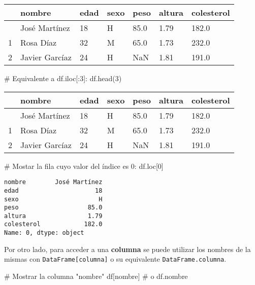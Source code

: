 \documentclass[
  letterpaper,
  DIV=11,
  numbers=noendperiod]{scrreprt}
\newenvironment{Shaded}{\begin{snugshade}}{\end{snugshade}}
\newcommand{\CommentTok}[1]{\textcolor[rgb]{0.37,0.37,0.37}{#1}}
\newcommand{\DecValTok}[1]{\textcolor[rgb]{0.68,0.00,0.00}{#1}}
\newcommand{\NormalTok}[1]{\textcolor[rgb]{0.00,0.23,0.31}{#1}}
\newcommand{\StringTok}[1]{\textcolor[rgb]{0.13,0.47,0.30}{#1}}
\begin{document}
\begin{longtable}[]{@{}lllllll@{}}
\toprule\noalign{}
& nombre & edad & sexo & peso & altura & colesterol \\
\midrule\noalign{}
\endhead
\bottomrule\noalign{}
\endlastfoot
0 & José Martínez & 18 & H & 85.0 & 1.79 & 182.0 \\
1 & Rosa Díaz & 32 & M & 65.0 & 1.73 & 232.0 \\
2 & Javier Garcíaz & 24 & H & NaN & 1.81 & 191.0 \\
\end{longtable}

\begin{Shaded}
\begin{Highlighting}[]
\CommentTok{\# Equivalente a df.iloc[:3]:}
\NormalTok{df.head(}\DecValTok{3}\NormalTok{)}
\end{Highlighting}
\end{Shaded}

\begin{longtable}[]{@{}lllllll@{}}
\toprule\noalign{}
& nombre & edad & sexo & peso & altura & colesterol \\
\midrule\noalign{}
\endhead
\bottomrule\noalign{}
\endlastfoot
0 & José Martínez & 18 & H & 85.0 & 1.79 & 182.0 \\
1 & Rosa Díaz & 32 & M & 65.0 & 1.73 & 232.0 \\
2 & Javier Garcíaz & 24 & H & NaN & 1.81 & 191.0 \\
\end{longtable}

\begin{Shaded}
\begin{Highlighting}[]
\CommentTok{\# Mostar la fila cuyo valor del índice es 0:}
\NormalTok{df.loc[}\DecValTok{0}\NormalTok{]}
\end{Highlighting}
\end{Shaded}

\begin{verbatim}
nombre        José Martínez
edad                     18
sexo                      H
peso                   85.0
altura                 1.79
colesterol            182.0
Name: 0, dtype: object
\end{verbatim}

Por otro lado, para acceder a una \textbf{columna} se puede utilizar los
nombres de la mismas con \texttt{DataFrame{[}columna{]}} o su
equivalente \texttt{DataFrame.columna}.

\begin{Shaded}
\begin{Highlighting}[]
\CommentTok{\# Mostrar la columna "nombre"}
\NormalTok{df[}\StringTok{\textquotesingle{}nombre\textquotesingle{}}\NormalTok{] }\CommentTok{\# o df.nombre}
\end{Highlighting}
\end{Shaded}
\end{document}
